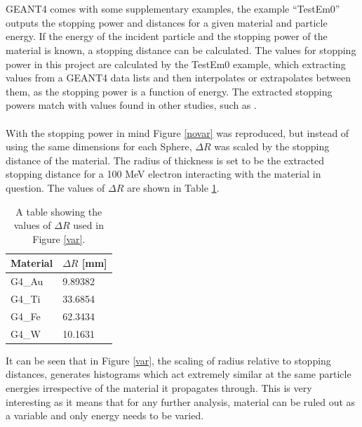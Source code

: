 \documentclass[12pt,a4paper]{article}
\begin{document}
\\\\
\noindent GEANT4 comes with some supplementary examples, the example ``TestEm0'' \cite{emo} outputs the stopping power and distances for a given material and particle energy. If the energy of the incident particle and the stopping power of the material is known, a stopping distance can be calculated. The values for stopping power in this project are calculated by the TestEm0 example, which extracting values from a GEANT4 data lists and then interpolates or extrapolates between them, as the stopping power is a function of energy. The extracted stopping powers match with values found in other studies, such as \cite{stpdat}.
\\\\
\noindent With the stopping power in mind Figure \ref{novar} was reproduced, but instead of using the same dimensions for each Sphere, $\Delta R$ was scaled by the stopping distance of the material. The radius of thickness is set to be the extracted stopping distance for a 100 MeV electron interacting with the material in question. The values of $\Delta R$ are shown in Table \ref{rs}.
\newpage
\begin{table}[h!]
\centering
\begin{tabular}{|l|l|}
\hline
Material & $\Delta R$ [mm] \\ \hline
G4\_Au &  9.89382\\ \hline
G4\_Ti &  33.6854\\ \hline
G4\_Fe &  62.3434\\ \hline
G4\_W &  10.1631\\ \hline
\end{tabular}
\caption{A table showing the values of $\Delta R$ used in Figure \ref{var}.}
\label{rs}
\end{table}
\noindent It can be seen that in Figure \ref{var}, the scaling of radius relative to stopping distances, generates histograms which act extremely similar at the same particle energies irrespective of the material it propagates through. This is very interesting as it means that for any further analysis, material can be ruled out as a variable and only energy needs to be varied.
\\\\
\end{document}
